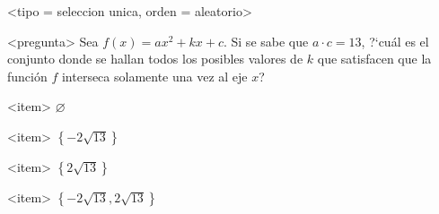 <tipo = seleccion unica, orden = aleatorio>

<pregunta>
Sea $f(x)=ax^2+kx+c$. Si se sabe que $a\cdot c=13$, ?`cu\'al es el conjunto donde se hallan todos los posibles valores de $k$ que satisfacen que la funci\'on $f$ interseca solamente una vez al eje $x$?


<item>
$\varnothing$

<item>
$\left\{-2\sqrt{13}\right\}$

<item>
$\left\{2\sqrt{13}\right\}$

<item>
$\left\{-2\sqrt{13},2\sqrt{13}\right\}$



